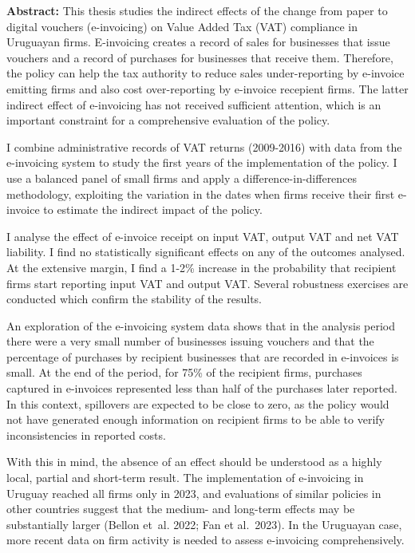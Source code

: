 \textbf{Abstract:} This thesis studies the indirect effects of the change from paper to digital vouchers (e-invoicing) on Value Added Tax (VAT) compliance in Uruguayan firms. E-invoicing creates a record of sales for businesses that issue vouchers and a record of purchases for businesses that receive them. Therefore, the policy can help the tax authority to reduce sales under-reporting by e-invoice emitting firms and also cost over-reporting by e-invoice recepient firms. The latter indirect effect of e-invoicing has not received sufficient attention, which is an important constraint for a comprehensive evaluation of the policy.

I combine administrative records of VAT returns (2009-2016) with data from the e-invoicing system to study the first years of the implementation of the policy. I use a balanced panel of small firms and apply a difference-in-differences methodology, exploiting the variation in the dates when firms receive their first e-invoice to estimate the indirect impact of the policy. 

I analyse the effect of e-invoice receipt on input VAT, output VAT and net VAT liability. I find no statistically significant effects on any of the outcomes analysed. At the extensive margin, I find a 1-2\% increase in the probability that recipient firms start reporting input VAT and output VAT. Several robustness exercises are conducted which confirm the stability of the results.

An exploration of the e-invoicing system data shows that in the analysis period there were a very small number of businesses issuing vouchers and that the percentage of purchases by recipient businesses that are recorded in e-invoices is small. At the end of the period, for 75\% of the recipient firms, purchases captured in e-invoices represented less than half of the purchases later reported. In this context, spillovers are expected to be close to zero, as the policy would not have generated enough information on recipient firms to be able to verify inconsistencies in reported costs.

With this in mind, the absence of an effect should be understood as a highly local, partial and short-term result. The implementation of e-invoicing in Uruguay reached all firms only in 2023, and evaluations of similar policies in other countries suggest that the medium- and long-term effects may be substantially larger (Bellon et~al. 2022; Fan et al.~2023). In the Uruguayan case, more recent data on firm activity is needed to assess e-invoicing comprehensively.
